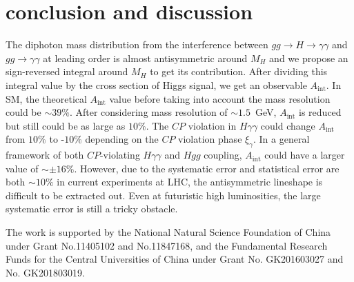 \documentclass[twocolumn,
prd,amssymb,amsmath,preprintnumbers,
floatfix,aps,nofootinbib]{revtex4-1}
\newcommand{\red}{\color{red}}
\newcommand{\black}{\color{black}}
\begin{document}
\section{conclusion and discussion\label{section:conclusion}}

The diphoton mass distribution from
the interference between $gg\to H \to \gamma\gamma$ and $gg\to \gamma\gamma$
at leading order is almost antisymmetric around $M_H$ and we propose
an sign-reversed integral around $M_H$ to get its contribution.
After dividing this integral value by the cross section of Higgs signal,
we get an observable $A_{\text{int}}$.
In SM, the theoretical $A_{\text{int}}$ value 
 before taking into account
the mass resolution could be $\sim39\%$. \black
After considering mass resolution
of $\sim1.5$~GeV, $A_{\text{int}}$ is reduced but still
could be as large as $10\%$.
The $CP$ violation in $H\gamma\gamma$ could change $A_{\text{int}}$ from
$10\%$ to -$10\%$ depending on the $CP$ violation phase $\xi_\gamma$.
In a general framework of both $CP$-violating $H\gamma\gamma$ and $Hgg$ coupling,
$A_{\text{int}}$ could have a larger value of $\sim \pm 16\%$.
However, due to the systematic error and statistical error are both $\sim 10\%$ in
current experiments at LHC, the antisymmetric lineshape is difficult to be extracted out.
Even at futuristic high luminosities, the large systematic error is still a tricky obstacle.



\begin{acknowledgments}
The work is supported by the National Natural Science Foundation of China under Grant No.11405102 and No.11847168, and the Fundamental Research Funds for the Central Universities of China under Grant No. GK201603027 and No. GK201803019.


\end{acknowledgments}

\appendix



\end{document}
